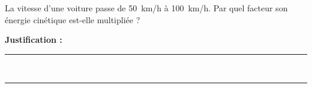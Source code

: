 La vitesse d'une voiture passe de \qty{50}{km/h} à \qty{100}{km/h}. Par quel facteur son énergie cinétique est-elle multipliée ?

\choices

\noindent\textbf{Justification :} \hrulefill \\[2.5ex]
\rule{\linewidth}{0.4pt} \\[2.5ex]
\rule{\linewidth}{0.4pt}
\vfill
